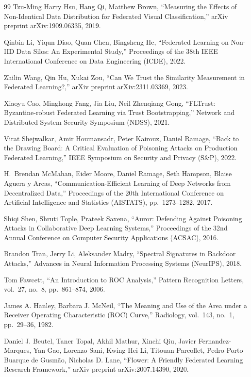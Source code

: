 \documentclass[a4j, dvipdfmx]{jsarticle}
\begin{document}
{\begin{thebibliography}{99}
Tzu-Ming Harry Hsu, Hang Qi, Matthew Brown,
``Measuring the Effects of Non-Identical Data Distribution for Federated Visual Classification,''
arXiv preprint arXiv:1909.06335, 2019.

Qinbin Li, Yiqun Diao, Quan Chen, Bingsheng He,
``Federated Learning on Non-IID Data Silos: An Experimental Study,''
Proceedings of the 38th IEEE International Conference on Data Engineering (ICDE), 2022.

Zhilin Wang, Qin Hu, Xukai Zou,
``Can We Trust the Similarity Measurement in Federated Learning?,''
arXiv preprint arXiv:2311.03369, 2023.

Xiaoyu Cao, Minghong Fang, Jia Liu, Neil Zhenqiang Gong,
``FLTrust: Byzantine-robust Federated Learning via Trust Bootstrapping,''
Network and Distributed System Security Symposium (NDSS), 2021.

Virat Shejwalkar, Amir Houmansadr, Peter Kairouz, Daniel Ramage,
``Back to the Drawing Board: A Critical Evaluation of Poisoning Attacks on Production Federated Learning,''
IEEE Symposium on Security and Privacy (S\&P), 2022.

H.~Brendan McMahan, Eider Moore, Daniel Ramage, Seth Hampson, Blaise Aguera y Arcas,
``Communication-Efficient Learning of Deep Networks from Decentralized Data,''
Proceedings of the 20th International Conference on Artificial Intelligence and Statistics (AISTATS),
pp.~1273--1282, 2017.

Shiqi Shen, Shruti Tople, Prateek Saxena,
``Auror: Defending Against Poisoning Attacks in Collaborative Deep Learning Systems,''
Proceedings of the 32nd Annual Conference on Computer Security Applications (ACSAC), 2016.

Brandon Tran, Jerry Li, Aleksander Madry,
``Spectral Signatures in Backdoor Attacks,''
Advances in Neural Information Processing Systems (NeurIPS), 2018.

Tom Fawcett,
``An Introduction to ROC Analysis,''
Pattern Recognition Letters, vol.~27, no.~8, pp.~861--874, 2006.

James A. Hanley, Barbara J. McNeil,
``The Meaning and Use of the Area under a Receiver Operating Characteristic (ROC) Curve,''
Radiology, vol.~143, no.~1, pp.~29--36, 1982.

Daniel J. Beutel, Taner Topal, Akhil Mathur, Xinchi Qiu, Javier Fernandez-Marques, Yan Gao, Lorenzo Sani, Kwing Hei Li, Titouan Parcollet, Pedro Porto Buarque de Gusm\~{a}o, Nicholas D. Lane,
``Flower: A Friendly Federated Learning Research Framework,''
arXiv preprint arXiv:2007.14390, 2020.

\end{thebibliography}
}
\end{document}
